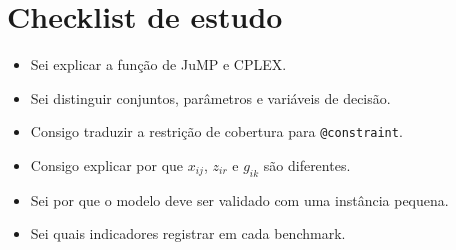 \documentclass[11pt,a4paper]{article}
\begin{document}
\section{Checklist de estudo}
\begin{itemize}[label=$\square$]
\item Sei explicar a função de JuMP e CPLEX.
\item Sei distinguir conjuntos, parâmetros e variáveis de decisão.
\item Consigo traduzir a restrição de cobertura para \texttt{@constraint}.
\item Consigo explicar por que $x_{ij}$, $z_{ir}$ e $g_{ik}$ são diferentes.
\item Sei por que o modelo deve ser validado com uma instância pequena.
\item Sei quais indicadores registrar em cada benchmark.
\end{itemize}
\end{document}
